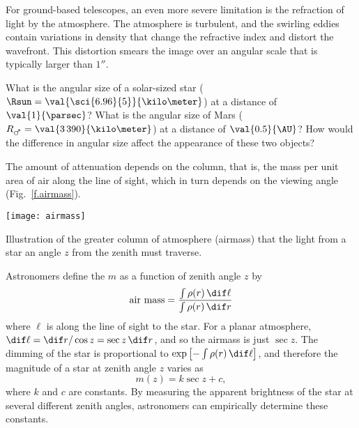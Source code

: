 For ground-based telescopes, an even more severe limitation is the refraction of light by the atmosphere. The atmosphere is turbulent, and the swirling eddies contain variations in density that change the refractive index and distort the wavefront.  This distortion smears the image over an angular scale that is typically larger than $1''$.

\begin{exercisebox}
What is the angular size of a solar-sized star ($\Rsun = \val{\sci{6.96}{5}}{\kilo\meter}$) at a distance of $\val{1}{\parsec}$?  What is the angular size of Mars ($R_{\mars} = \val{3\,390}{\kilo\meter}$) at a distance of $\val{0.5}{\AU}$?  How would the difference in angular size affect the appearance of these two objects?
\end{exercisebox}

 The amount of attenuation depends on the column, that is, the mass per unit area of air along the line of sight, which in turn depends on the viewing angle (Fig.~\ref{f.airmass}).

\begin{marginfigure}
\texttt{[image: airmass]}
\caption[Illustration of airmass]{Illustration of the greater column of atmosphere (airmass) that the light from a star an angle $z$ from the zenith must traverse.}
\label{f.airmass}
\end{marginfigure}

Astronomers define the  $m$ as a function of zenith angle $z$ by
\[
	\textrm{air mass} = \frac{\int\rho(r)\,\dif \ell}{\int\rho(r)\,\dif r}
\]
where $\ell$ is along the line of sight to the star.  For a planar atmosphere, $\dif\ell = \dif r/\cos z = \sec z\,\dif r$, and so the airmass is just $\sec z$.  The dimming of the star is proportional to $\exp\left[-\int\rho(r)\,\dif\ell\right]$, and therefore the magnitude of a star at zenith angle $z$ varies as
\[ m(z) = k \sec z + c, \]
where $k$ and $c$ are constants.  By measuring the apparent brightness of the star at several different zenith angles, astronomers can empirically determine these constants.
